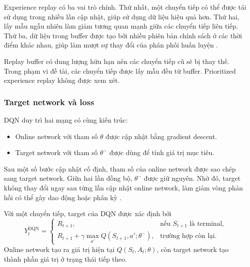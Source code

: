 Experience replay có ba vai trò chính. Thứ nhất, một chuyển tiếp có thể được tái sử dụng trong nhiều lần cập nhật, giúp sử dụng dữ liệu hiệu quả hơn. Thứ hai, lấy mẫu ngẫu nhiên làm giảm tương quan mạnh giữa các chuyển tiếp liên tiếp. Thứ ba, dữ liệu trong buffer được tạo bởi nhiều phiên bản chính sách ở các thời điểm khác nhau, giúp làm mượt sự thay đổi của phân phối huấn luyện \cite{Mnih2013,Mnih2015}.

Replay buffer có dung lượng hữu hạn nên các chuyển tiếp cũ sẽ bị thay thế. Trong phạm vi đề tài, các chuyển tiếp được lấy mẫu đều từ buffer. Prioritized experience replay không được xem xét.

\subsubsection{Target network và loss}

DQN duy trì hai mạng có cùng kiến trúc:
\begin{itemize}
    \item Online network với tham số $\theta$ được cập nhật bằng gradient descent.
    \item Target network với tham số $\theta^{-}$ được dùng để tính giá trị mục tiêu.
\end{itemize}
Sau một số bước cập nhật cố định, tham số của online network được sao chép sang target network. Giữa hai lần đồng bộ, $\theta^{-}$ được giữ nguyên. Nhờ đó, target không thay đổi ngay sau từng lần cập nhật online network, làm giảm vòng phản hồi có thể gây dao động hoặc phân kỳ \cite{Mnih2015}.

Với một chuyển tiếp, target của DQN được xác định bởi
\begin{equation}
    Y_t^{\mathrm{DQN}}
    =
    \begin{cases}
        R_{t+1},
        & \text{nếu } S_{t+1} \text{ là terminal},\\[4pt]
        R_{t+1}
        + \gamma
        \displaystyle\max_{a'}
        Q(S_{t+1},a';\theta^{-}),
        & \text{trường hợp còn lại}.
    \end{cases}
    \label{eq:dqn-target}
\end{equation}
Online network tạo ra giá trị hiện tại $Q(S_t,A_t;\theta)$, còn target network tạo thành phần giá trị ở trạng thái tiếp theo.

